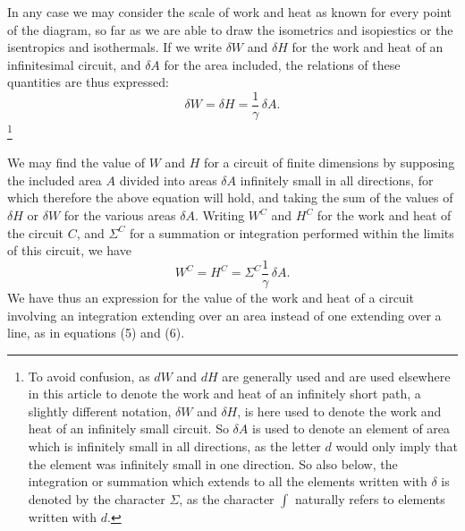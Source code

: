 \documentclass[11pt]{article}
\begin{document}
In any case we may consider the scale of work and heat as known for every point of the diagram, so far as we are able to draw the isometrics and isopiestics or the isentropics and isothermals. If we write $\delta W$ and $\delta H$ for the work and heat of an infinitesimal circuit, and $\delta A$ for the area included, the relations of these quantities are thus expressed:
\begin{equation}
\delta W=\delta H=\frac1\gamma\,\delta A. \tag{7}
\end{equation}
\footnote{To avoid confusion, as $dW$ and $dH$ are generally used and are used elsewhere in this article to denote the work and heat of an infinitely short path, a slightly different notation, $\delta W$ and $\delta H$, is here used to denote the work and heat of an infinitely small circuit. So $\delta A$ is used to denote an element of area which is infinitely small in all directions, as the letter $d$ would only imply that the element was infinitely small in one direction. So also below, the integration or summation which extends to all the elements written with $\delta$ is denoted by the character $\Sigma$, as the character $\int$ naturally refers to elements written with $d$.}

We may find the value of $W$ and $H$ for a circuit of finite dimensions by supposing the included area $A$ divided into areas $\delta A$ infinitely small in all directions, for which therefore the above equation will hold, and taking the sum of the values of $\delta H$ or $\delta W$ for the various areas $\delta A$. Writing $W^C$ and $H^C$ for the work and heat of the circuit $C$, and $\Sigma^C$ for a summation or integration performed within the limits of this circuit, we have
\begin{equation}
W^C=H^C=\Sigma^C \frac1\gamma\,\delta A. \tag{8}
\end{equation}
We have thus an expression for the value of the work and heat of a circuit involving an integration extending over an area instead of one extending over a line, as in equations (5) and (6).
\end{document}
